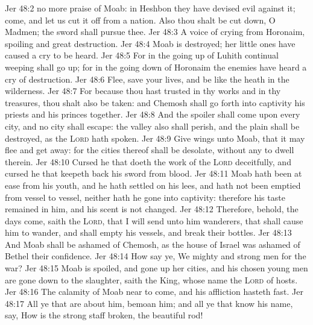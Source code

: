 \vs Jer 48:2  no more praise of Moab: in Heshbon they have devised evil against it; come, and let us cut it off from  a nation. Also thou shalt be cut down, O Madmen; the sword shall pursue thee.
\vs Jer 48:3 A voice of crying  from Horonaim, spoiling and great destruction.
\vs Jer 48:4 Moab is destroyed; her little ones have caused a cry to be heard.
\vs Jer 48:5 For in the going up of Luhith continual weeping shall go up; for in the going down of Horonaim the enemies have heard a cry of destruction.
\vs Jer 48:6 Flee, save your lives, and be like the heath in the wilderness.
\vs Jer 48:7 For because thou hast trusted in thy works and in thy treasures, thou shalt also be taken: and Chemosh shall go forth into captivity  his priests and his princes together.
\vs Jer 48:8 And the spoiler shall come upon every city, and no city shall escape: the valley also shall perish, and the plain shall be destroyed, as the \textsc{Lord} hath spoken.
\vs Jer 48:9 Give wings unto Moab, that it may flee and get away: for the cities thereof shall be desolate, without any to dwell therein.
\vs Jer 48:10 Cursed  he that doeth the work of the \textsc{Lord} deceitfully, and cursed  he that keepeth back his sword from blood.
\vs Jer 48:11 Moab hath been at ease from his youth, and he hath settled on his lees, and hath not been emptied from vessel to vessel, neither hath he gone into captivity: therefore his taste remained in him, and his scent is not changed.
\vs Jer 48:12 Therefore, behold, the days come, saith the \textsc{Lord}, that I will send unto him wanderers, that shall cause him to wander, and shall empty his vessels, and break their bottles.
\vs Jer 48:13 And Moab shall be ashamed of Chemosh, as the house of Israel was ashamed of Bethel their confidence.
\vs Jer 48:14 How say ye, We  mighty and strong men for the war?
\vs Jer 48:15 Moab is spoiled, and gone up  her cities, and his chosen young men are gone down to the slaughter, saith the King, whose name  the \textsc{Lord} of hosts.
\vs Jer 48:16 The calamity of Moab  near to come, and his affliction hasteth fast.
\vs Jer 48:17 All ye that are about him, bemoan him; and all ye that know his name, say, How is the strong staff broken,  the beautiful rod!
